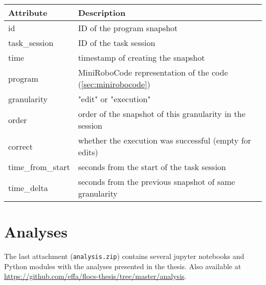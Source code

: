 \begin{tabular}{l l}
\toprule
Attribute & Description \\
\midrule
id & ID of the program snapshot \\
task\_session & ID of the task session \\
time & timestamp of creating the snapshot \\
program & MiniRoboCode representation of the code (\cref{sec:minirobocode}) \\
granularity & "edit" or "execution" \\
order & order of the snapshot of this granularity in the session \\
correct & whether the execution was successful (empty for edits) \\
time\_from\_start & seconds from the start of the task session \\
time\_delta & seconds from the previous snapshot of same granularity \\
\bottomrule
\end{tabular}


\section{Analyses}
\label{sec:attachment.analyses}

The last attachment (\texttt{analysis.zip})
contains several jupyter notebooks and Python modules with the analyses
presented in the thesis.
Also available at
\url{https://github.com/effa/flocs-thesis/tree/master/analysis}.
